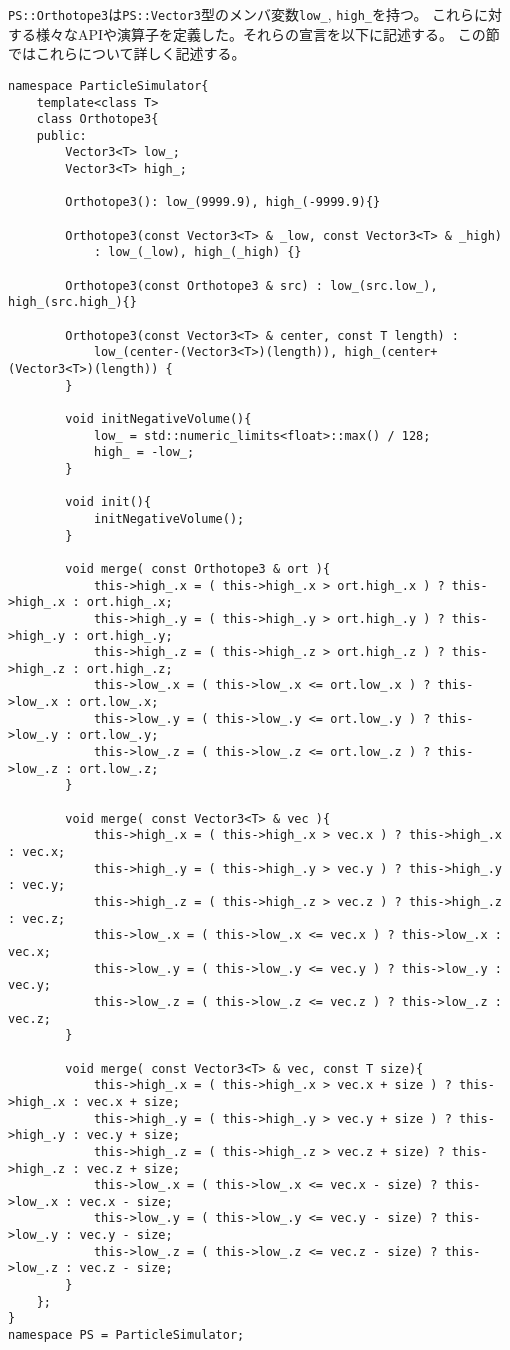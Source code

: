\texttt{PS::Orthotope3}は\texttt{PS::Vector3}型のメンバ変数\texttt{low\_}, \texttt{high\_}を持つ。
これらに対する様々なAPIや演算子を定義した。それらの宣言を以下に記述する。
この節ではこれらについて詳しく記述する。
\begin{lstlisting}[caption=Orthotope3]
namespace ParticleSimulator{
    template<class T>
    class Orthotope3{
    public:
        Vector3<T> low_;
        Vector3<T> high_;

        Orthotope3(): low_(9999.9), high_(-9999.9){}

        Orthotope3(const Vector3<T> & _low, const Vector3<T> & _high)
            : low_(_low), high_(_high) {}

        Orthotope3(const Orthotope3 & src) : low_(src.low_), high_(src.high_){}

        Orthotope3(const Vector3<T> & center, const T length) :
            low_(center-(Vector3<T>)(length)), high_(center+(Vector3<T>)(length)) {
        }

        void initNegativeVolume(){
            low_ = std::numeric_limits<float>::max() / 128;
            high_ = -low_;
        }

        void init(){
            initNegativeVolume();
        }

        void merge( const Orthotope3 & ort ){
            this->high_.x = ( this->high_.x > ort.high_.x ) ? this->high_.x : ort.high_.x;
            this->high_.y = ( this->high_.y > ort.high_.y ) ? this->high_.y : ort.high_.y;
            this->high_.z = ( this->high_.z > ort.high_.z ) ? this->high_.z : ort.high_.z;
            this->low_.x = ( this->low_.x <= ort.low_.x ) ? this->low_.x : ort.low_.x;
            this->low_.y = ( this->low_.y <= ort.low_.y ) ? this->low_.y : ort.low_.y;
            this->low_.z = ( this->low_.z <= ort.low_.z ) ? this->low_.z : ort.low_.z;
        }

        void merge( const Vector3<T> & vec ){
            this->high_.x = ( this->high_.x > vec.x ) ? this->high_.x : vec.x;
            this->high_.y = ( this->high_.y > vec.y ) ? this->high_.y : vec.y;
            this->high_.z = ( this->high_.z > vec.z ) ? this->high_.z : vec.z;
            this->low_.x = ( this->low_.x <= vec.x ) ? this->low_.x : vec.x;
            this->low_.y = ( this->low_.y <= vec.y ) ? this->low_.y : vec.y;
            this->low_.z = ( this->low_.z <= vec.z ) ? this->low_.z : vec.z;
        }

        void merge( const Vector3<T> & vec, const T size){
            this->high_.x = ( this->high_.x > vec.x + size ) ? this->high_.x : vec.x + size;
            this->high_.y = ( this->high_.y > vec.y + size ) ? this->high_.y : vec.y + size;
            this->high_.z = ( this->high_.z > vec.z + size) ? this->high_.z : vec.z + size;
            this->low_.x = ( this->low_.x <= vec.x - size) ? this->low_.x : vec.x - size;
            this->low_.y = ( this->low_.y <= vec.y - size) ? this->low_.y : vec.y - size;
            this->low_.z = ( this->low_.z <= vec.z - size) ? this->low_.z : vec.z - size;
        }
    };
}
namespace PS = ParticleSimulator;
\end{lstlisting}

